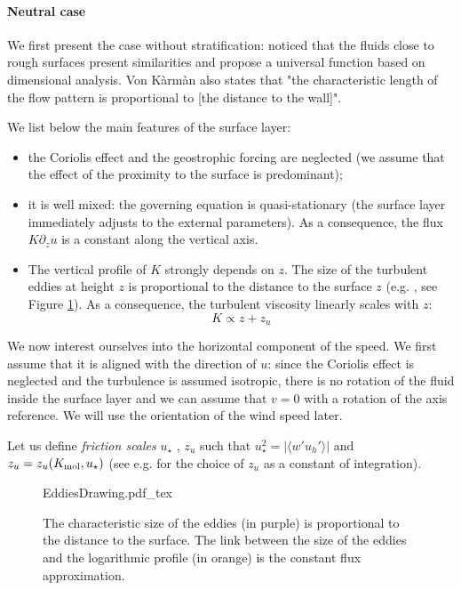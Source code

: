 \paragraph{Neutral case}
We first present the case without stratification:
\citep{karman_mechanische_1930} noticed that the
fluids close to rough surfaces present similarities and
propose a universal function based on dimensional analysis.
Von Kàrmàn also states that "the characteristic length
of the flow pattern is proportional to
[the distance to the wall]".
\par
We list below the main features of the surface layer:
\begin{itemize}
	\item the Coriolis effect and the geostrophic forcing are
		neglected (we assume that the effect of the
		proximity to the surface is predominant);
	\item it is well mixed: the governing equation
		is quasi-stationary (the surface layer
		immediately adjusts to the external parameters).
		As a consequence, the flux $K \partial_z u$
		is a constant along the vertical axis.
	\item The vertical profile of $K$ strongly depends 
		on $z$.
		The size of the turbulent eddies at height $z$
		is proportional to the distance to the surface $z$
		(e.g. \cite{kawai_wall-modeling_2012}, see Figure
		\ref{fig:airseaSCM_eddiesDrawing}).
		As a consequence, the turbulent viscosity
		linearly scales with $z$:
		\begin{equation}
			K \propto z+z_u
		\end{equation}
\end{itemize}
We now interest ourselves into the horizontal component of
the speed. We first assume that it is aligned with the
direction of $u$: since the Coriolis effect
is neglected and the turbulence is assumed isotropic,
there is no rotation of the fluid inside the surface layer
and we can assume that $v=0$
with a rotation of the axis reference.
We will use the orientation of the wind speed later.
\par
Let us define \textit{friction scales} $u_\star$
, $z_{u}$ such that $u_\star^2 =
|\langle w' u_h' \rangle|$ and
$z_{u} = z_{u}(K_{\rm mol}, u_\star)$
(see e.g. \citep{schlichting_boundary_1960}
for the choice of $z_{u}$ as a constant
of integration).
\begin{figure}
	\centering
	{EddiesDrawing.pdf_tex}
	\caption{The characteristic size of the eddies
	(in purple) is proportional to the distance to the
	surface. The link between the size of the eddies
	and the logarithmic profile (in orange) is
	the constant flux approximation.
	}
	\label{fig:airseaSCM_eddiesDrawing}
\end{figure}
